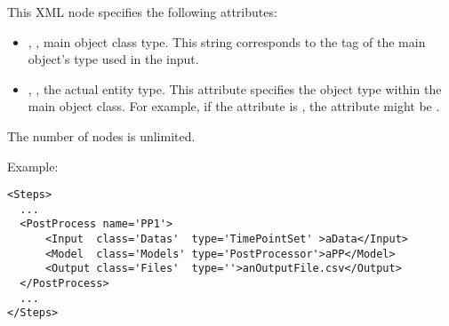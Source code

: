 \begin{itemize}
  This XML node specifies the following attributes:
\begin{itemize}
  \item {}, , main object class
    type.
    This string corresponds to the tag of the main object's type used in the
    input.
  \item {}, , the actual entity
    type.
    This attribute specifies the object type within the main object class.
    For example, if the   attribute is , the
     attribute might be .
\end{itemize}
\nb The number of  nodes is unlimited.
\end{itemize}

Example:
\begin{lstlisting}[style=XML,morekeywords={class}]
<Steps>
  ...
  <PostProcess name='PP1'>
      <Input  class='Datas'  type='TimePointSet' >aData</Input>
      <Model  class='Models' type='PostProcessor'>aPP</Model>
      <Output class='Files'  type=''>anOutputFile.csv</Output>
  </PostProcess>
  ...
</Steps>
\end{lstlisting}
